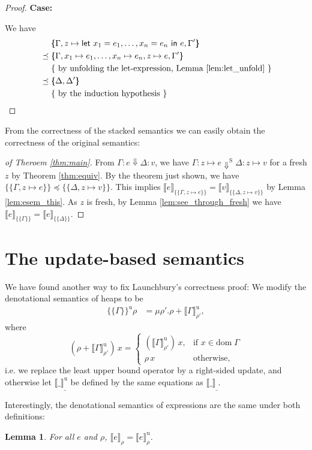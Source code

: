 \documentclass{jfp1}
\newtheorem{lemma}{Lemma}
\theoremstyle{nonumberbreak}
\newtheorem{proof}{Proof}
\newcommand{\sLet}[2]{\text{\textsf{let}}\ #1\ \text{\textsf{in}}\ #2}
\newcommand{\sred}[4]{#1 : #2 \Downarrow #3 : #4}
\newcommand{\ssred}[4]{#1 : #2 \Downarrow^{\textrm{S}} #3 : #4}
\newcommand{\sRule}[1]{\text{{\textsc{#1}}}}
\newcommand{\dom}[1]{\text{dom}\;#1}
\newcommand{\xeng}{x_1 = e_1, \ldots, x_n = e_n}
\newcommand{\xen}{x_1\mapsto e_1, \ldots, x_n\mapsto e_n}
\newcommand{\dsem}[2]{\llbracket #1 \rrbracket_{#2}}
\newcommand{\esem}[1]{\{\!\!\!\{#1\}\!\!\!\}}
\newcommand{\dsemu}[2]{\llbracket #1 \rrbracket^{\text{u}}_{#2}}
\newcommand{\esemu}[1]{\{\!\!\!\{#1\}\!\!\!\}^{\text{u}}}
\newcommand{\case}[1]{\par\smallskip\noindent\textbf{Case:} #1\nopagebreak\par\noindent\ignorespaces}
\newcommand{\beginright}{&\mathrel{\phantom{=}}}
\newcommand{\aexpl}[1]{&\mathrel{\phantom{=}}\left\{\text{ #1 }\right\}}
\begin{document}
\begin{proof}
\case{\sRule{Let}}
We have
\begin{align*}
\beginright
\esem{\Gamma,z \mapsto \sLet{\xeng}e, \Gamma'}\\
&\preceq \esem{\Gamma,\xen, z \mapsto e, \Gamma'} \\
\aexpl{by unfolding the let-expression, Lemma \ref{lem:let_unfold}} \\
&\preceq \esem{\Delta,\Delta'}\\
\aexpl{by the induction hypothesis}
\end{align*}
\end{proof}

From the correctness of the stacked semantics we can easily obtain the correctness of the original semantics:

\begin{proof}[of Theroem \ref{thm:main}]
From $\sred \Gamma e \Delta v$, we have $\ssred{\Gamma}{z \mapsto e}{\Delta}{z\mapsto v}$ for a fresh $z$ by Theorem \ref{thm:equiv}. By the theorem just shown, we have $\esem{\Gamma, z \mapsto e} \preceq \esem{\Delta, z\mapsto v}$. This implies $\dsem{e}{\esem{\Gamma, z \mapsto e}} = \dsem{v}{\esem{\Delta, z\mapsto v}}$ by Lemma \ref{lem:esem_this}. As $z$ is fresh, by Lemma \ref{lem:see_through_fresh} we have $\dsem{e}{\esem{\Gamma}} = \dsem{e}{\esem{\Delta}}$.
\end{proof}

\section{The update-based semantics}
\label{updsemantics}

We have found another way to fix Launchbury's correctness proof: We modify the denotational semantics of heaps to be
\begin{align*}
\esemu{ \Gamma }\rho &= \mu \rho'. \rho + \dsemu{\Gamma}{\rho'},
\end{align*}
where
\[
(\rho + \dsemu{\Gamma}{\rho'})\, x = 
\begin{cases}
(\dsemu{\Gamma}{\rho'})\, x, &\text{if } x \in \dom \Gamma\\
\rho\, x &\text{otherwise},
\end{cases}
\]
i.e. we replace the least upper bound operator by a right-sided update, and otherwise let $\dsemu{\_}\_$ be defined by the same equations as $\dsem{\_}\_$.

Interestingly, the denotational semantics of expressions are the same under both definitions:
\begin{lemma}
For all $e$ and $\rho$, $\dsem{e}{\rho} = \dsemu{e}{\rho}$.
\label{lem:deneq}
\end{lemma}
\end{document}
